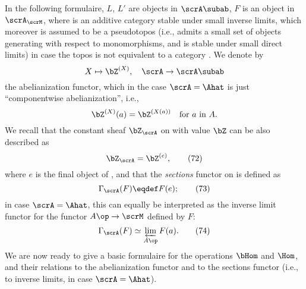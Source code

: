 In the following formulaire, $L$, $L'$ are objects in $\scrA\subab$,
$F$ is an object in $\scrA_\scrM$, where \scrM{} is an additive
category stable under small inverse limits, which moreover is assumed
to be a pseudotopos (i.e., admits a small set of objects generating
with respect to monomorphisms, and is stable under small direct
limits) in case the topos \scrA{} is not equivalent to a category
\Ahat. We denote by
\[X\mapsto\bZ^{(X)}, \quad \scrA\to\scrA\subab\]
the abelianization functor, which in the case $\scrA=\Ahat$ is just
``componentwise abelianization'', i.e.,
\[\bZ^{(X)}(a)=\bZ^{(X(a))}\quad\text{for $a$ in $A$.}\]
We recall that the constant sheaf $\bZ_\scrA$ on \scrA{} with value
$\bZ$ can be also described as
\begin{equation}
  \label{eq:106.72}
  \bZ_\scrA=\bZ^{(e)},\tag{72}
\end{equation}
where $e$ is the final object of \scrA, and that the \emph{sections}
functor on \scrA{} is defined as
\begin{equation}
  \label{eq:106.73}
  \Gamma_\scrA(F) \eqdef F(e);\tag{73}
\end{equation}
in case $\scrA=\Ahat$, this can equally be interpreted as the inverse
limit functor for the functor $A\op\to\scrM$ defined by $F$:
\begin{equation}
  \label{eq:106.74}
  \Gamma_\scrA(F) \simeq \varprojlim_{A\op} F(a).\tag{74}
\end{equation}
We are now ready to give a basic formulaire for the operations $\bHom$
and $\Hom$, and their relations to the abelianization functor and to
the sections functor (i.e., to inverse limits, in case $\scrA=\Ahat$).

